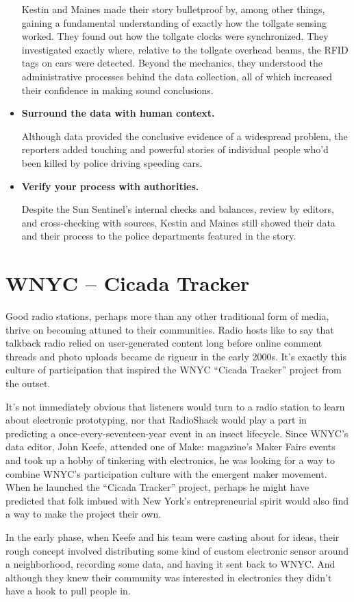 \begin{itemize}
Kestin and Maines made their story bulletproof by, among other
things, gaining a fundamental understanding of exactly how the tollgate
sensing worked. They found out how the tollgate clocks were
synchronized. They investigated exactly where, relative to the tollgate
overhead beams, the RFID tags on cars were detected. Beyond
the mechanics, they understood the administrative processes behind
the data collection, all of which increased their confidence in making
sound conclusions.
\item \textbf{Surround the data with human context.}

Although data provided the conclusive evidence of a widespread
problem, the reporters added touching and powerful stories of individual
people who'd been killed by police driving speeding cars.
\item \textbf{Verify your process with authorities.}

Despite the Sun Sentinel's internal checks and balances, review by editors,
and cross-checking with sources, Kestin and Maines still showed
their data and their process to the police departments featured in
the story.
\end{itemize}

\section{WNYC – Cicada Tracker}
Good radio stations, perhaps more than any other traditional form of media,
thrive on becoming attuned to their communities. Radio hosts like to say
that talkback radio relied on user-generated content long before online
comment threads and photo uploads became de rigueur in the early 2000s.
It's exactly this culture of participation that inspired the WNYC ``Cicada
Tracker'' project from the outset.

It's not immediately obvious that listeners would turn to a radio station to
learn about electronic prototyping, nor that RadioShack would play a part
in predicting a once-every-seventeen-year event in an insect lifecycle. Since
WNYC's data editor, John Keefe, attended one of Make: magazine's Maker
Faire events and took up a hobby of tinkering with electronics, he was looking
for a way to combine WNYC's participation culture with the emergent
maker movement. When he launched the ``Cicada Tracker'' project, perhaps
he might have predicted that folk imbued with New York's entrepreneurial
spirit would also find a way to make the project their own.

In the early phase, when Keefe and his team were casting about for ideas,
their rough concept involved distributing some kind of custom electronic
sensor around a neighborhood, recording some data, and having it sent
back to WNYC. And although they knew their community was interested
in electronics they didn't have a hook to pull people in.

